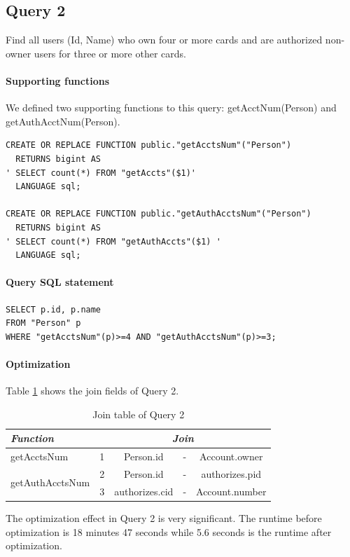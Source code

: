 \documentclass[11pt]{article}
\begin{document}
\subsection{Query 2}
Find all users (Id, Name) who own four or more cards and are authorized non-owner users for three or more other cards.

\paragraph{Supporting functions} We defined two supporting functions to this query: getAcctNum(Person) and getAuthAcctNum(Person).
\begin{verbatim}
CREATE OR REPLACE FUNCTION public."getAcctsNum"("Person")
  RETURNS bigint AS
' SELECT count(*) FROM "getAccts"($1)'
  LANGUAGE sql;

CREATE OR REPLACE FUNCTION public."getAuthAcctsNum"("Person")
  RETURNS bigint AS
' SELECT count(*) FROM "getAuthAccts"($1) '
  LANGUAGE sql;
\end{verbatim}

\paragraph{Query SQL statement}
\begin{verbatim}
SELECT p.id, p.name
FROM "Person" p
WHERE "getAcctsNum"(p)>=4 AND "getAuthAcctsNum"(p)>=3;
\end{verbatim}

\paragraph{Optimization} Table \ref{tab:q2} shows the join fields of Query 2.

\begin{table}[!htbp]
\centering
\label{tab:q2}
\caption{Join table of Query 2}
\begin{tabular}{|l||r|c|l|c|}
\hline
{\itshape Function} & \multicolumn{4}{c|}{\itshape Join} \\
\hline
getAcctsNum & 1 & Person.id & - & Account.owner \\
\hline
\multirow{2}{*}{getAuthAcctsNum} & 2 & Person.id & - & authorizes.pid \\
\cline{2-5}
& 3 & authorizes.cid & - & Account.number \\
\hline
\end{tabular}
\end{table}

\par
The optimization effect in Query 2 is very significant. The runtime before optimization is 18 minutes 47 seconds while 5.6 seconds is the runtime after optimization.
\end{document}
